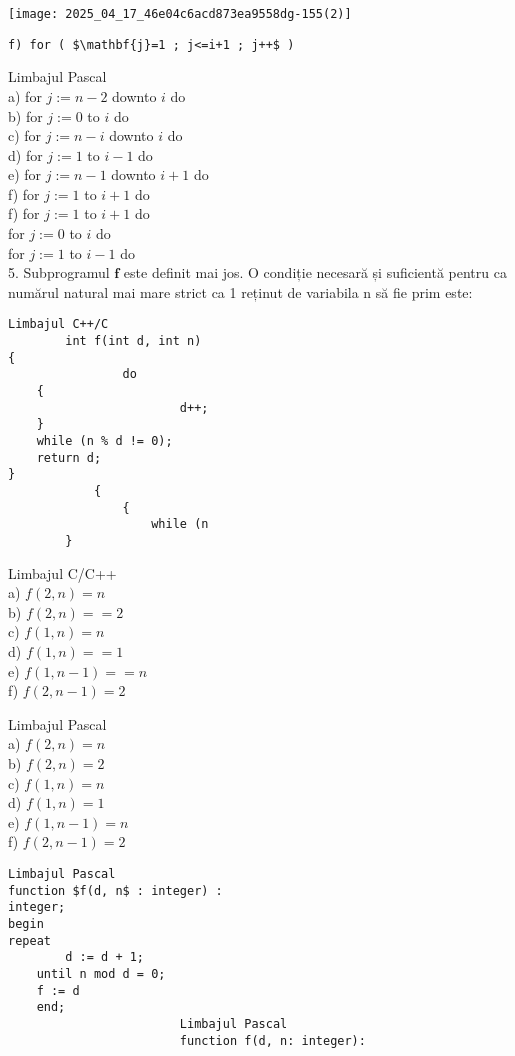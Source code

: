 \begin{center}
\texttt{[image: 2025\_04\_17\_46e04c6acd873ea9558dg-155(2)]}
\end{center}

\begin{verbatim}
f) for ( $\mathbf{j}=1 ; j<=i+1 ; j++$ )
\end{verbatim}

Limbajul Pascal\\
a) for $j:=n-2$ downto $i$ do\\
b) for $j:=0$ to $i$ do\\
c) for $j:=n-i$ downto $i$ do\\
d) for $j:=1$ to $i-1$ do\\
e) for $j:=n-1$ downto $i+1$ do\\
f) for $j:=1$ to $i+1$ do\\
f) for $j:=1$ to $i+1$ do\\
for $j:=0$ to $i$ do\\
for $j:=1$ to $i-1$ do\\
5. Subprogramul $\mathbf{f}$ este definit mai jos. O condiție necesară și suficientă pentru ca numărul natural mai mare strict ca 1 reținut de variabila n să fie prim este:

\begin{verbatim}
Limbajul C++/C
        int f(int d, int n)
{
                do
    {
                        d++;
    }
    while (n % d != 0);
    return d;
}
            {
                {
                    while (n
        }
\end{verbatim}

Limbajul C/C++\\
a) $f(2, n)=n$\\
b) $f(2, n)==2$\\
c) $f(1, n)=n$\\
d) $f(1, n)==1$\\
e) $f(1, n-1)==n$\\
f) $f(2, n-1)=2$

Limbajul Pascal\\
a) $f(2, n)=n$\\
b) $f(2, n)=2$\\
c) $f(1, n)=n$\\
d) $f(1, n)=1$\\
e) $f(1, n-1)=n$\\
f) $f(2, n-1)=2$

\begin{verbatim}
Limbajul Pascal
function $f(d, n$ : integer) :
integer;
begin
repeat
        d := d + 1;
    until n mod d = 0;
    f := d
    end;
                        Limbajul Pascal
                        function f(d, n: integer):
\end{verbatim}

